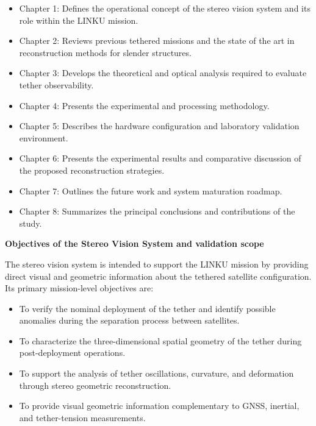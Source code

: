 \begin{itemize}
    \item Chapter 1: Defines the operational concept of the stereo vision system and its role within the LINKU mission.
    \item Chapter 2: Reviews previous tethered missions and the state of the art in reconstruction methods for slender structures.
    \item Chapter 3: Develops the theoretical and optical analysis required to evaluate tether observability.
    \item Chapter 4: Presents the experimental and processing methodology.
    \item Chapter 5: Describes the hardware configuration and laboratory validation environment.
    \item Chapter 6: Presents the experimental results and comparative discussion of the proposed reconstruction strategies.
    \item Chapter 7: Outlines the future work and system maturation roadmap.
    \item Chapter 8: Summarizes the principal conclusions and contributions of the study.
\end{itemize}

\vspace{0.5cm}
\noindent \textbf{Objectives of the Stereo Vision System and validation scope}
\vspace{0.2cm}

The stereo vision system is intended to support the LINKU mission by providing direct visual and geometric information about the tethered satellite configuration. Its primary mission-level objectives are:

\begin{itemize}
    \item To verify the nominal deployment of the tether and identify possible anomalies during the separation process between satellites.
    \item To characterize the three-dimensional spatial geometry of the tether during post-deployment operations.
    \item To support the analysis of tether oscillations, curvature, and deformation through stereo geometric reconstruction.
    \item To provide visual geometric information complementary to GNSS, inertial, and tether-tension measurements.
\end{itemize}

